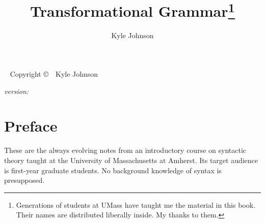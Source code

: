 \documentclass[nols,nofonts,twoside,sfsidenotes]{tufte-book}
\title{Transformational Grammar\thanks{Generations of students at UMass have taught me the material in this book. Their names are distributed liberally inside. My thanks to them.}}
\author[Kyle Johnson]{Kyle Johnson}
\begin{document}
\maketitle


\newpage
\begin{fullwidth}
~\vfill
\thispagestyle{empty}
\setlength{\parindent}{0pt}
\setlength{\parskip}{\baselineskip}
Copyright \copyright\ \the\year\ Kyle Johnson

\par\textit{version: \monthyear}
\end{fullwidth}


\frontmatter
\tableofcontents


\cleardoublepage
\chapter*{Preface}

\noindent
These are the always evolving notes from an introductory course on syntactic theory taught at the University of Massachusetts at Amherst. Its target audience is first-year graduate students. No background knowledge of syntax is presupposed. 






\mainmatter
\raggedbottom

\setcounter{page}{1}






% 
% 




\end{document}
